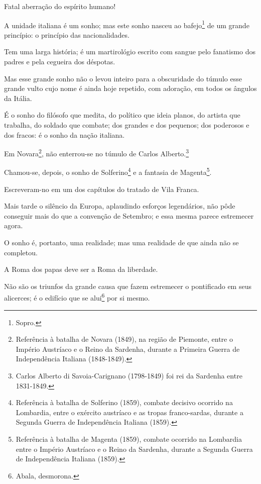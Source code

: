 Fatal aberração do espírito humano!

A unidade italiana é um sonho; mas este sonho nasceu ao
bafejo\footnote{Sopro.} de um grande princípio: o princípio das
nacionalidades.

Tem uma larga história; é um martirológio escrito com sangue pelo
fanatismo dos padres e pela cegueira dos déspotas.

Mas esse grande sonho não o levou inteiro para a obscuridade do túmulo
esse grande vulto cujo nome é ainda hoje repetido, com adoração, em
todos os ângulos da Itália.

É o sonho do filósofo que medita, do político que ideia planos, do
artista que trabalha, do soldado que combate; dos grandes e dos
pequenos; dos poderosos e dos fracos: é o sonho da nação italiana.

Em Novara\footnote{Referência à batalha de Novara (1849), na região de
  Piemonte, entre o Império Austríaco e o Reino da Sardenha, durante a
  Primeira Guerra de Independência Italiana (1848-1849).}, não
enterrou-se no túmulo de Carlos Alberto.\footnote{Carlos Alberto di
  Savoia-Carignano (1798-1849) foi rei da Sardenha entre 1831-1849.}

Chamou-se, depois, o sonho de Solferino\footnote{Referência à batalha
  de Solferino (1859), combate decisivo ocorrido na Lombardia, entre o
  exército austríaco e as tropas franco-sardas, durante a Segunda Guerra
  de Independência Italiana (1859).} e a fantasia de Magenta\footnote{
  Referência à batalha de Magenta (1859), combate ocorrido na Lombardia
  entre o Império Austríaco e o Reino da Sardenha, durante a Segunda
  Guerra de Independência Italiana (1859).}.

Escreveram-no em um dos capítulos do tratado de Vila Franca.

Mais tarde o silêncio da Europa, aplaudindo esforços legendários, não
pôde conseguir mais do que a convenção de Setembro; e essa mesma parece
estremecer agora.

O sonho é, portanto, uma realidade; mas uma realidade de que ainda não
se completou.

A Roma dos papas deve ser a Roma da liberdade.

Não são os triunfos da grande causa que fazem estremecer o pontificado
em seus alicerces; é o edifício que se alui\footnote{Abala, desmorona.}
por si mesmo.

